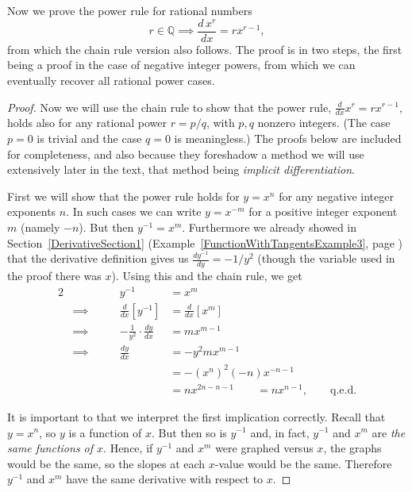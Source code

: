 Now we prove the power rule for rational numbers
$$r\in\mathbb{Q}\implies\frac{d\,x^r}{dx}=rx^{r-1},$$
from which the chain rule version also follows.
The proof is in two steps, the first being a proof in the case
of negative integer powers, from  which we can eventually
recover all rational power cases.

\begin{proof}
Now we will use the chain rule to show that the
power rule, $\frac{d}{dx}x^r=rx^{r-1}$, holds
also for any rational power $r=p/q$, with 
$p,q$ nonzero integers.   (The case $p=0$ is trivial
and the case $q=0$ is meaningless.)
The proofs below are included for completeness,
and also because they foreshadow a method we
will use extensively later in the text, that
method being {\it implicit differentiation}.

First we will show that the power rule holds
for $y=x^n$ for any negative integer exponents  $n$. 
In such cases we can write
$y=x^{-m}$ for a positive integer exponent $m$ (namely $-n$).
But then $y^{-1}=x^m$.  Furthermore  we already showed 
in Section~\ref{DerivativeSection1} 
(Example~\ref{FunctionWithTangentsExample3},
page \pageref{FunctionWithTangentsExample3}) that 
the derivative definition gives us
$\frac{dy^{-1}}{dy}=-1/y^2$ (though the variable used in the
proof there was $x$).
Using this and the chain rule, we get
\begin{alignat*}{2}
&&y^{-1}&=x^m\\
&\implies\qquad&\frac{d}{dx}\left[y^{-1}\right]&=\frac{d}{dx}\left[x^m\right]\\
&\implies&-\frac1{y^2}\cdot\frac{dy}{dx}&=mx^{m-1}\\
&\implies&\frac{dy}{dx}&=-y^2mx^{m-1}\\
&&&=-(x^n)^2(-n)x^{-n-1}\\
&&&=nx^{2n-n-1}\qquad=nx^{n-1},\qquad\text{q.e.d.}
\end{alignat*}

It is important to that we interpret the first implication
correctly.  Recall that $y=x^n$, so $y$ is a function
of $x$.  But then so is $y^{-1}$ and, in fact,
$y^{-1}$ and $x^m$ are {\it the same functions of $x$}.
Hence, if $y^{-1}$ and $x^m$ were graphed versus $x$, the
graphs would be the same, so the slopes at each $x$-value would
be the same. Therefore $y^{-1}$ and $x^m$ have the same 
derivative with respect to $x$.


\end{proof}
